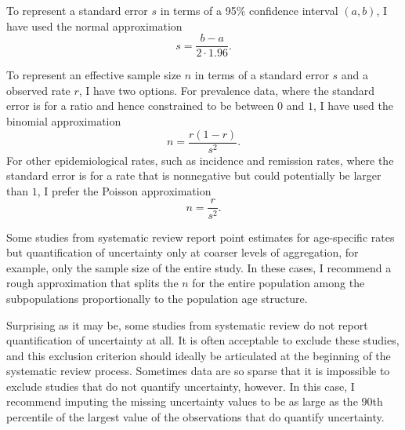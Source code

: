 To represent a standard error $s$ in terms of a 95\% confidence
interval $(a,b)$, I have used the normal approximation
\[
s = \frac{b-a}{2\cdot 1.96}.
\]

To represent an effective sample size $n$ in terms of a standard error
$s$ and a observed rate $r$, I have two options.  For prevalence data,
where the standard error is for a ratio and hence constrained to be
between $0$ and $1$, I have used the binomial approximation
\[
n = \frac{r(1-r)}{s^2}.
\]
For other epidemiological rates, such as incidence and remission
rates, where the standard error is for a rate that is nonnegative but
could potentially be larger than $1$, I prefer the Poisson
approximation
\[
n = \frac{r}{s^2}.
\]

Some studies from systematic review report point estimates for
age-specific rates but quantification of uncertainty only at coarser
levels of aggregation, for example, only the sample size of the entire
study.  In these cases, I recommend a rough approximation that splits
the $n$ for the entire population among the subpopulations
proportionally to the population age structure.

Surprising as it may be, some studies from systematic review do not
report quantification of uncertainty at all.  It is often acceptable
to exclude these studies, and this exclusion criterion should ideally
be articulated at the beginning of the systematic review process.
Sometimes data are so sparse that it is impossible to exclude studies
that do not quantify uncertainty, however.  In this case, I recommend
imputing the missing uncertainty values to be as large as the $90$th
percentile of the largest value of the observations that do quantify
uncertainty.




